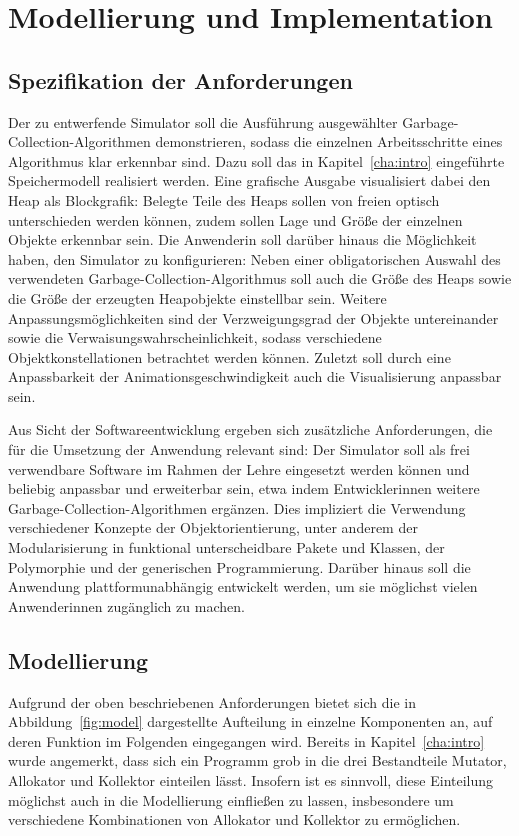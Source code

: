 \chapter{Modellierung und Implementation}
\label{cha:modelling}


\section{Spezifikation der Anforderungen}
\label{sec:requirements}
Der zu entwerfende Simulator soll die Ausführung ausgewählter Garbage-Collection-Algorithmen demonstrieren, sodass die einzelnen Arbeitsschritte eines Algorithmus klar erkennbar sind.
Dazu soll das in Kapitel~\ref{cha:intro} eingeführte Speichermodell realisiert werden.
Eine grafische Ausgabe visualisiert dabei den Heap als Blockgrafik: Belegte Teile des Heaps sollen von freien optisch unterschieden werden können, zudem sollen Lage und Größe der einzelnen Objekte erkennbar sein.
Die Anwenderin soll darüber hinaus die Möglichkeit haben, den Simulator zu konfigurieren:
Neben einer obligatorischen Auswahl des verwendeten Garbage-Collection-Algorithmus soll auch die Größe des Heaps sowie die Größe der erzeugten Heapobjekte einstellbar sein.
Weitere Anpassungsmöglichkeiten sind der Verzweigungsgrad der Objekte untereinander sowie die Verwaisungswahrscheinlichkeit, sodass verschiedene Objektkonstellationen betrachtet werden können.
Zuletzt soll durch eine Anpassbarkeit der Animationsgeschwindigkeit auch die Visualisierung anpassbar sein.

Aus Sicht der Softwareentwicklung ergeben sich zusätzliche Anforderungen, die für die Umsetzung der Anwendung relevant sind:
Der Simulator soll als frei verwendbare Software im Rahmen der Lehre eingesetzt werden können und beliebig anpassbar und erweiterbar sein, etwa indem Entwicklerinnen weitere Garbage-Collection-Algorithmen ergänzen.
Dies impliziert die Verwendung verschiedener Konzepte der Objektorientierung, unter anderem der Modularisierung in funktional unterscheidbare Pakete und Klassen, der Polymorphie und der generischen Programmierung.
Darüber hinaus soll die Anwendung plattformunabhängig entwickelt werden, um sie möglichst vielen Anwenderinnen zugänglich zu machen.

\section{Modellierung}
\label{sec:model}
Aufgrund der oben beschriebenen Anforderungen bietet sich die in Abbildung~\ref{fig:model} dargestellte Aufteilung in einzelne Komponenten an, auf deren Funktion im Folgenden eingegangen wird.
Bereits in Kapitel~\ref{cha:intro} wurde angemerkt, dass sich ein Programm grob in die drei Bestandteile Mutator, Allokator und Kollektor einteilen lässt.
Insofern ist es sinnvoll, diese Einteilung möglichst auch in die Modellierung einfließen zu lassen, insbesondere um verschiedene Kombinationen von Allokator und Kollektor zu ermöglichen.

